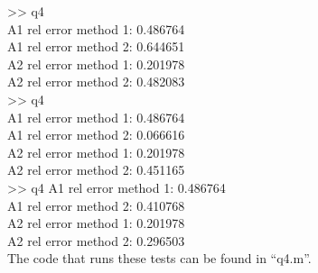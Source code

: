 \documentclass[paper=a4, fontsize=11pt]{scrartcl} %
\numberwithin{equation}{section} %
\numberwithin{figure}{section} %
\numberwithin{table}{section} %
\begin{document}
>> q4 \\
A1 rel error method 1: 0.486764 \\
A1 rel error method 2: 0.644651 \\
A2 rel error method 1: 0.201978 \\
A2 rel error method 2: 0.482083 \\
>> q4 \\
A1 rel error method 1: 0.486764 \\
A1 rel error method 2: 0.066616 \\
A2 rel error method 1: 0.201978 \\
A2 rel error method 2: 0.451165 \\ 
>> q4
A1 rel error method 1: 0.486764 \\
A1 rel error method 2: 0.410768 \\ 
A2 rel error method 1: 0.201978 \\
A2 rel error method 2: 0.296503 \\

The code that runs these tests can be found in ``q4.m''.

\end{document}
